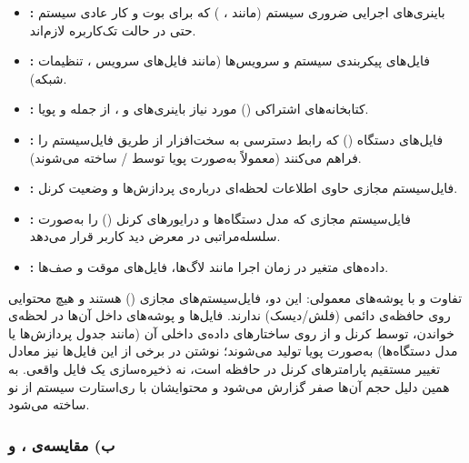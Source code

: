 \begin{itemize}
	\item \textbf{:} باینری‌های اجرایی ضروری سیستم (مانند ، ) که برای بوت و کار عادی سیستم حتی در حالت تک‌کاربره لازم‌اند.
	\item \textbf{:} فایل‌های پیکربندی سیستم و سرویس‌ها (مانند فایل‌های  سرویس ، تنظیمات شبکه).
	\item \textbf{:} کتابخانه‌های اشتراکی () مورد نیاز باینری‌های  و ، از جمله  و  پویا.
	\item \textbf{:} فایل‌های دستگاه () که رابط دسترسی به سخت‌افزار از طریق فایل‌سیستم را فراهم می‌کنند (معمولاً به‌صورت پویا توسط / ساخته می‌شوند).
	\item \textbf{:} فایل‌سیستم مجازی حاوی اطلاعات لحظه‌ای درباره‌ی پردازش‌ها و وضعیت کرنل.
	\item \textbf{:} فایل‌سیستم مجازی که مدل دستگاه‌ها و درایورهای کرنل () را به‌صورت سلسله‌مراتبی در معرض دید کاربر قرار می‌دهد.
	\item \textbf{:} داده‌های متغیر در زمان اجرا مانند لاگ‌ها، فایل‌های موقت و صف‌ها.
\end{itemize}

تفاوت  و  با پوشه‌های معمولی: این دو، فایل‌سیستم‌های مجازی () هستند و هیچ محتوایی روی حافظه‌ی دائمی (فلش/دیسک) ندارند. فایل‌ها و پوشه‌های داخل آن‌ها در لحظه‌ی خواندن، توسط کرنل و از روی ساختارهای داده‌ی داخلی آن (مانند جدول پردازش‌ها یا مدل دستگاه‌ها) به‌صورت پویا تولید می‌شوند؛ نوشتن در برخی از این فایل‌ها نیز معادل تغییر مستقیم پارامترهای کرنل در حافظه است، نه ذخیره‌سازی یک فایل واقعی. به همین دلیل حجم آن‌ها صفر گزارش می‌شود و محتوایشان با ری‌استارت سیستم از نو ساخته می‌شود.

\subsubsection*{ب) مقایسه‌ی ،‏  و }

